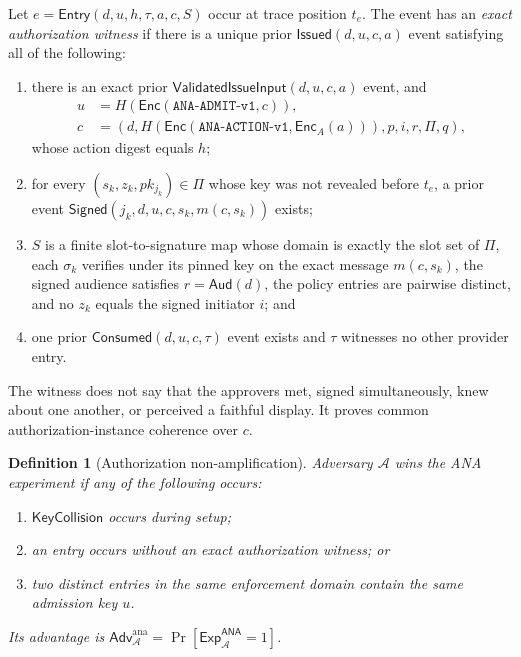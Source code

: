 \documentclass[10pt]{article}
\newtheorem{definition}{Definition}
\newcommand{\code}[1]{\texttt{#1}}
\newcommand{\Adv}{\mathsf{Adv}}
\newcommand{\Enc}{\mathsf{Enc}}
\newcommand{\ANA}{\mathsf{ANA}}
\newcommand{\Entry}{\mathsf{Entry}}
\newcommand{\Signed}{\mathsf{Signed}}
\begin{document}
Let $e=\Entry(d,u,h,\tau,a,c,S)$ occur at trace position $t_e$. The event has an
\emph{exact authorization witness} if there is a unique prior
$\mathsf{Issued}(d,u,c,a)$ event satisfying all of the following:

\begin{enumerate}[leftmargin=*]
\item there is an exact prior $\mathsf{ValidatedIssueInput}(d,u,c,a)$ event,
and
\begin{align*}
u&=H(\Enc(\code{ANA-ADMIT-v1},c)),\\
c&=(d,H(\Enc(\code{ANA-ACTION-v1},\Enc_A(a))),p,i,r,\Pi,q),
\end{align*}
whose action digest equals $h$;
\item for every $(s_k,z_k,pk_{j_k})\in\Pi$ whose key was not revealed before
$t_e$, a prior event
$\Signed(j_k,d,u,c,s_k,m(c,s_k))$ exists;
\item $S$ is a finite slot-to-signature map whose domain is exactly the slot
set of $\Pi$,
each $\sigma_k$ verifies under its pinned key on the exact message $m(c,s_k)$,
the signed audience satisfies $r=\mathsf{Aud}(d)$, the policy entries are
pairwise distinct, and no $z_k$ equals
the signed initiator $i$; and
\item one prior $\mathsf{Consumed}(d,u,c,\tau)$ event exists and $\tau$ witnesses
no other provider entry.
\end{enumerate}

The witness does not say that the approvers met, signed simultaneously, knew
about one another, or perceived a faithful display. It proves common
authorization-instance coherence over $c$.

\begin{definition}[Authorization non-amplification]
Adversary $\mathcal A$ wins the ANA experiment if any of the following occurs:

\begin{enumerate}[leftmargin=*]
\item $\mathsf{KeyCollision}$ occurs during setup;
\item an entry occurs without an exact authorization witness; or
\item two distinct entries in the same enforcement domain contain the same
admission key $u$.
\end{enumerate}

Its advantage is
$\Adv^{\mathrm{ana}}_{\mathcal A}=\Pr[\mathsf{Exp}^{\ANA}_{\mathcal A}=1]$.
\end{definition}
\end{document}
